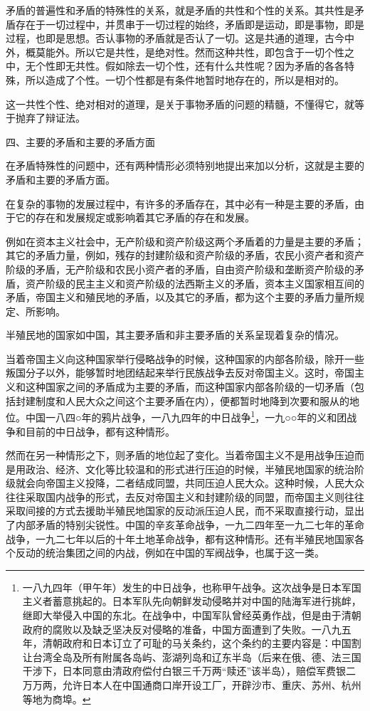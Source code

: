 \documentclass[UTF8, 12pt, a4paper]{ctexrep}
\begin{document}
矛盾的普遍性和矛盾的特殊性的关系，就是矛盾的共性和个性的关系。其共性是矛盾存在于一切过程中，并贯串于一切过程的始终，矛盾即是运动，即是事物，即是过程，也即是思想。否认事物的矛盾就是否认了一切。这是共通的道理，古今中外，概莫能外。所以它是共性，是绝对性。然而这种共性，即包含于一切个性之中，无个性即无共性。假如除去一切个性，还有什么共性呢？因为矛盾的各各特殊，所以造成了个性。一切个性都是有条件地暂时地存在的，所以是相对的。

这一共性个性、绝对相对的道理，是关于事物矛盾的问题的精髓，不懂得它，就等于抛弃了辩证法。

四、主要的矛盾和主要的矛盾方面

在矛盾特殊性的问题中，还有两种情形必须特别地提出来加以分析，这就是主要的矛盾和主要的矛盾方面。

在复杂的事物的发展过程中，有许多的矛盾存在，其中必有一种是主要的矛盾，由于它的存在和发展规定或影响着其它矛盾的存在和发展。

例如在资本主义社会中，无产阶级和资产阶级这两个矛盾着的力量是主要的矛盾；其它的矛盾力量，例如，残存的封建阶级和资产阶级的矛盾，农民小资产者和资产阶级的矛盾，无产阶级和农民小资产者的矛盾，自由资产阶级和垄断资产阶级的矛盾，资产阶级的民主主义和资产阶级的法西斯主义的矛盾，资本主义国家相互间的矛盾，帝国主义和殖民地的矛盾，以及其它的矛盾，都为这个主要的矛盾力量所规定、所影响。

半殖民地的国家如中国，其主要矛盾和非主要矛盾的关系呈现着复杂的情况。

当着帝国主义向这种国家举行侵略战争的时候，这种国家的内部各阶级，除开一些叛国分子以外，能够暂时地团结起来举行民族战争去反对帝国主义。这时，帝国主义和这种国家之间的矛盾成为主要的矛盾，而这种国家内部各阶级的一切矛盾（包括封建制度和人民大众之间这个主要矛盾在内），便都暂时地降到次要和服从的地位。中国一八四○年的鸦片战争，一八九四年的中日战争\footnote{一八九四年（甲午年）发生的中日战争，也称甲午战争。这次战争是日本军国主义者蓄意挑起的。日本军队先向朝鲜发动侵略并对中国的陆海军进行挑衅，继即大举侵入中国的东北。在战争中，中国军队曾经英勇作战，但是由于清朝政府的腐败以及缺乏坚决反对侵略的准备，中国方面遭到了失败。一八九五年，清朝政府和日本订立了可耻的马关条约，这个条约的主要内容是：中国割让台湾全岛及所有附属各岛屿、澎湖列岛和辽东半岛（后来在俄、德、法三国干涉下，日本同意由清政府偿付白银三千万两“赎还”该半岛），赔偿军费银二万万两，允许日本人在中国通商口岸开设工厂，开辟沙市、重庆、苏州、杭州等地为商埠。}，一九○○年的义和团战争和目前的中日战争，都有这种情形。

然而在另一种情形之下，则矛盾的地位起了变化。当着帝国主义不是用战争压迫而是用政治、经济、文化等比较温和的形式进行压迫的时候，半殖民地国家的统治阶级就会向帝国主义投降，二者结成同盟，共同压迫人民大众。这种时候，人民大众往往采取国内战争的形式，去反对帝国主义和封建阶级的同盟，而帝国主义则往往采取间接的方式去援助半殖民地国家的反动派压迫人民，而不采取直接行动，显出了内部矛盾的特别尖锐性。中国的辛亥革命战争，一九二四年至一九二七年的革命战争，一九二七年以后的十年土地革命战争，都有这种情形。还有半殖民地国家各个反动的统治集团之间的内战，例如在中国的军阀战争，也属于这一类。
\end{document}
